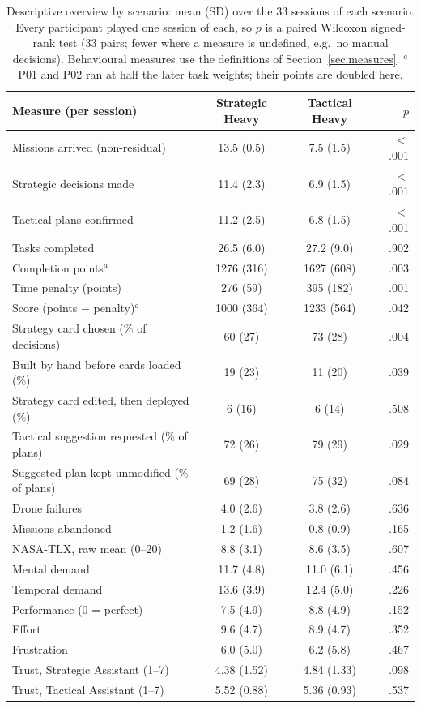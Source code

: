\begin{table}[htbp]
\centering
\small
\caption{Descriptive overview by scenario: mean (SD) over the 33 sessions of each scenario. Every participant played one session of each, so $p$ is a paired Wilcoxon signed-rank test (33 pairs; fewer where a measure is undefined, e.g.\ no manual decisions). Behavioural measures use the definitions of Section~\ref{sec:measures}. $^a$P01 and P02 ran at half the later task weights; their points are doubled here.}
\label{tab:descriptives}
\begin{tabular}{lccr}
\toprule
\textbf{Measure (per session)} & \textbf{Strategic Heavy} & \textbf{Tactical Heavy} & $p$ \\
\midrule
Missions arrived (non-residual) & 13.5 (0.5) & 7.5 (1.5) & $<$.001 \\
Strategic decisions made & 11.4 (2.3) & 6.9 (1.5) & $<$.001 \\
Tactical plans confirmed & 11.2 (2.5) & 6.8 (1.5) & $<$.001 \\
Tasks completed & 26.5 (6.0) & 27.2 (9.0) & .902 \\
Completion points$^a$ & 1276 (316) & 1627 (608) & .003 \\
Time penalty (points) & 276 (59) & 395 (182) & .001 \\
Score (points $-$ penalty)$^a$ & 1000 (364) & 1233 (564) & .042 \\
Strategy card chosen (\% of decisions) & 60 (27) & 73 (28) & .004 \\
Built by hand before cards loaded (\%) & 19 (23) & 11 (20) & .039 \\
Strategy card edited, then deployed (\%) & 6 (16) & 6 (14) & .508 \\
Tactical suggestion requested (\% of plans) & 72 (26) & 79 (29) & .029 \\
Suggested plan kept unmodified (\% of plans) & 69 (28) & 75 (32) & .084 \\
Drone failures & 4.0 (2.6) & 3.8 (2.6) & .636 \\
Missions abandoned & 1.2 (1.6) & 0.8 (0.9) & .165 \\
NASA-TLX, raw mean (0--20) & 8.8 (3.1) & 8.6 (3.5) & .607 \\
\quad Mental demand & 11.7 (4.8) & 11.0 (6.1) & .456 \\
\quad Temporal demand & 13.6 (3.9) & 12.4 (5.0) & .226 \\
\quad Performance (0 = perfect) & 7.5 (4.9) & 8.8 (4.9) & .152 \\
\quad Effort & 9.6 (4.7) & 8.9 (4.7) & .352 \\
\quad Frustration & 6.0 (5.0) & 6.2 (5.8) & .467 \\
Trust, Strategic Assistant (1--7) & 4.38 (1.52) & 4.84 (1.33) & .098 \\
Trust, Tactical Assistant (1--7) & 5.52 (0.88) & 5.36 (0.93) & .537 \\
\bottomrule
\end{tabular}
\end{table}
